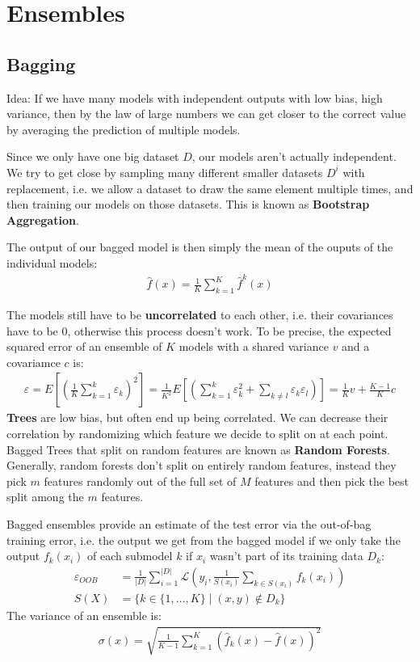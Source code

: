 \documentclass{report}
\renewcommand\epsilon{\varepsilon}
\newcommand{\tbf}{\textbf}
\newcommand*{\newpar}{\par\vspace{\baselineskip}\noindent}
\newcommand{\loss}{\mathcal{L}}
\begin{document}
\chapter{Ensembles}
\section{Bagging}
Idea: If we have many models with independent outputs with low bias, high variance, then by the law of large numbers we can get closer to the correct value by averaging the prediction of multiple models.
\newpar
Since we only have one big dataset $D$, our models aren't actually independent. We try to get close by sampling many different smaller datasets $D^i$ with replacement, i.e. we allow a dataset to draw the same element multiple times, and then training our models on those datasets. This is known as \tbf{Bootstrap Aggregation}.
\newpar
The output of our bagged model is then simply the mean of the ouputs of the individual models:
\begin{align}
 \hat{f}(x) = \frac{1}{K} \sum_{k=1}^K \hat{f}^k(x)
\end{align}
\newpar
The models still have to be \tbf{uncorrelated} to each other, i.e. their covariances have to be $0$, otherwise this process doesn't work. To be precise, the expected squared error of an ensemble of $K$ models with a shared variance $v$ and a covariamce $c$ is:
\begin{align}
 \epsilon = E\left[\left(\frac{1}{K}\sum_{k=1}^k \epsilon_k\right)^2\right] = \frac{1}{K^2}E\left[\left(\sum_{k=1}^k \epsilon_k^2 + \sum_{k \neq l} \epsilon_k \epsilon_l\right)\right] = \frac{1}{K}v + \frac{K-1}{K}c
\end{align}
\tbf{Trees} are low bias, but often end up being correlated. We can decrease their correlation by randomizing which feature we decide to split on at each point. Bagged Trees that split on random features are known as \tbf{Random Forests}. Generally, random forests don't split on entirely random features, instead they pick $m$ features randomly out of the full set of $M$ features and then pick the best split among the $m$ features.
\newpar
Bagged ensembles provide an estimate of the test error via the out-of-bag training error, i.e. the output we get from the bagged model if we only take the output $f_k(x_i)$ of each submodel $k$ if $x_i$ wasn't part of its training data $D_k$:
\begin{align}
 \epsilon_{OOB}& = \frac{1}{|D|} \sum_{i=1}^{|D|} \loss\left(y_i, \frac{1}{S(x_i)} \sum_{k \in S(x_i)}f_k(x_i)\right)\\
 S(X) &= \{k \in \{1, \hdots, K\} \mid (x,y) \notin D_{k}\}
\end{align}
The variance of an ensemble is:
\begin{align}
 \sigma(x) = \sqrt{\frac{1}{K-1}\sum_{k=1}^K \left(\hat{f}_k(x) -\hat{f}(x)\right)^2}
\end{align}
%
\end{document}
